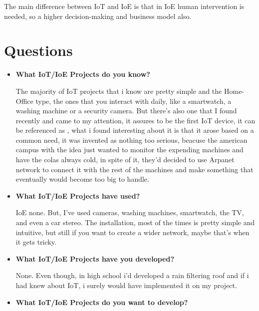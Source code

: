 \documentclass{IEEEtran}
\begin{document}
The main difference between IoT and IoE is that in IoE human intervention is needed, so a higher decision-making and business model also.


\section{Questions }\label{systemModel}
\begin{itemize}
     \item \textbf{What IoT/IoE Projects do you know?}
     
     The majority of IoT projects that i know are pretty simple and the Home-Office type, the ones that 
     you interact with daily, like a smartwatch, a washing machine or a security camera.
     But there's also one that I found recently and came to my attention, it assures to be the first IoT device, it can be referenced as \cite{xu2015animal},
     what i found interesting about it is that it arose based on a common need, it was invented 
     as nothing too serious, beacuse the american campus with the idea just wanted to monitor the expending
     machines and have the colas always cold, in spite of it, they'd decided to use Arpanet network to connect it
     with the rest of the machines and make something that eventually would become too big to handle.

     \item \textbf{What IoT/IoE Projects have used?}
     
     IoE none. But, I've used cameras, washing machines, smartwatch, the TV, and even a car stereo.
     The installation, most of the times is pretty simple and intuitive, but still
     if you want to create a wider network, maybe that's when it gets tricky.

     \item \textbf{What IoT/IoE Projects have you developed?}
     
     None. Even though, in high school i'd developed a rain filtering roof and if i had knew 
     about IoT, i surely would have implemented it on my project.

     \item \textbf{What IoT/IoE Projects do you want to develop?}
     

\end{itemize}
\end{document}
